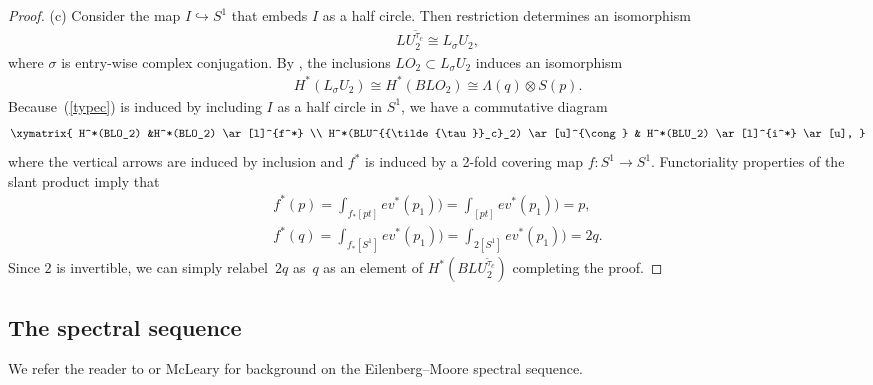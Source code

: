 \documentclass[pdftex]{sigma}
\numberwithin{equation}{section}
\begin{document}
\begin{proof}
(c) Consider the map $I \hookrightarrow S^1$ that embeds $I$ as a half circle. Then restriction determines an isomorphism
\begin{gather}\label{typec}
LU_2^{{\tilde{\tau}}_c} \cong L_{\sigma}U_2,
\end{gather}
where $\sigma$ is entry-wise complex conjugation. By \cite[Corollary~7.5]{B2}, the inclusions $LO_2 \subset L_{\sigma} U_2$ induces an isomorphism \begin{gather*} H^*( L_{\sigma} U_2) \cong H^*(BLO_2) \cong \Lambda (q) \otimes S(p).\end{gather*}
Because~(\ref{typec}) is induced by including $I$ as a half circle in $S^1$, we have a commutative diagram
\begin{gather*}\xymatrix{ H^*(BLO_2) &H^*(BLO_2) \ar[l]^{f^*} \\
H^*(BLU^{{\tilde{\tau}}_c}_2) \ar[u]^{\cong} & H^*(BLU_2) \ar[l]^{i^*} \ar[u], }\end{gather*}
where the vertical arrows are induced by inclusion and $f^*$ is induced by a 2-fold covering map $f\colon S^1 \rightarrow S^1$.
Functoriality properties of the slant product imply that
\begin{gather*} f^*(p) = \int_{f_*[pt]} ev^*(p_1)) = \int_{[pt]} ev^*(p_1)) = p , \\
 f^*(q) = \int_{f_*[S^1]} ev^*(p_1)) = \int_{2[S^1]} ev^*(p_1)) = 2 q .\end{gather*}
Since $2$ is invertible, we can simply relabel~$2q$ as~$q$ as an element of $H^*(BLU_2^{{\tilde{\tau}}_c})$ completing the proof.
\end{proof}

\subsection{The spectral sequence}

We refer the reader to \cite[Appendix~A]{B} or McLeary \cite[Section~7.1]{M} for background on the Eilenberg--Moore spectral sequence.
\end{document}
